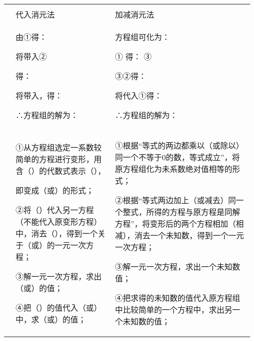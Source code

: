 \begin{longtable}[]{@{}lll@{}}
\toprule
\endhead
& &\tabularnewline
& 代入消元法 & 加减消元法\tabularnewline
\begin{minipage}[t]{0.30\columnwidth}\raggedright
\strut
\end{minipage} & \begin{minipage}[t]{0.30\columnwidth}\raggedright
由①得：

将带入②

得：

将带入，得：

∴方程组的解为：\strut
\end{minipage} & \begin{minipage}[t]{0.30\columnwidth}\raggedright
方程组可化为：

① 得： ③

③②得：

将代入①得：

∴方程组的解为：\strut
\end{minipage}\tabularnewline
\begin{minipage}[t]{0.30\columnwidth}\raggedright
\strut
\end{minipage} & \begin{minipage}[t]{0.30\columnwidth}\raggedright
①从方程组选定一系数较简单的方程进行变形，用含（）的代数式表示（），

即变成（或）的形式；

②将（）代入另一方程（不能代入原变形方程）中，消去（），得到一个关于（或）的一元一次方程；

③解一元一次方程，求出（或）的值；

④把（）的值代入（或）中，求（或）的值；\strut
\end{minipage} & \begin{minipage}[t]{0.30\columnwidth}\raggedright
①根据``等式的两边都乘以（或除以）同一个不等于0的数，等式成立''，将原方程组化为未系数绝对值相等的形式；

②根据``等式两边加上（或减去）同一个整式，所得的方程与原方程是同解方程''，将变形后的两个方程相加（相减），消去一个未知数，得到一个一元一次方程；

③解一元一次方程，求出一个未知数值；

④把求得的未知数的值代入原方程组中比较简单的一个方程中，求出另一个未知数的值；\strut
\end{minipage}\tabularnewline
\bottomrule
\end{longtable}

